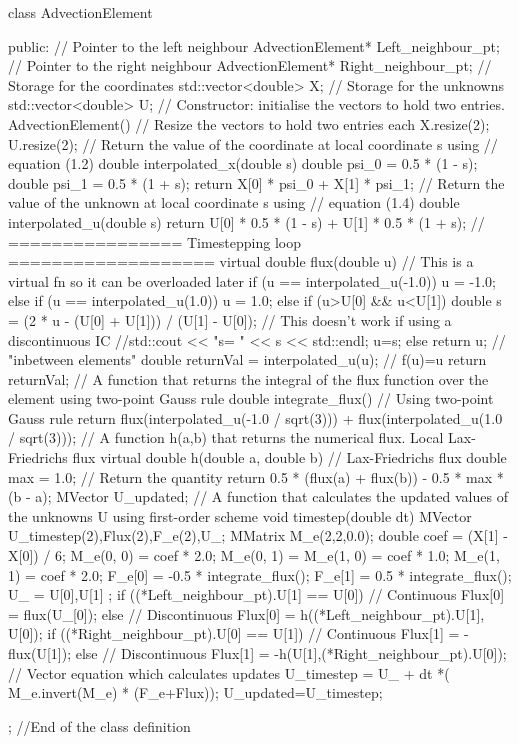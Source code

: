\documentclass[a4paper, 12pt]{article}
\begin{document}
\begin{spverbatim}

class AdvectionElement
{
public:
	// Pointer to the left neighbour
	AdvectionElement* Left_neighbour_pt;
	// Pointer to the right neighbour
	AdvectionElement* Right_neighbour_pt;
	// Storage for the coordinates
	std::vector<double> X;
	// Storage for the unknowns
	std::vector<double> U;
	// Constructor: initialise the vectors to hold two entries.
	AdvectionElement()
	{
		// Resize the vectors to hold two entries each
		X.resize(2);
		U.resize(2);
	}
	// Return the value of the coordinate at local coordinate s using
	// equation (1.2)
	double interpolated_x(double s)
	{
		double psi_0 = 0.5 * (1 - s);
		double psi_1 = 0.5 * (1 + s);
		return X[0] * psi_0 + X[1] * psi_1;
	}
	// Return the value of the unknown at local coordinate s using
	// equation (1.4)
	double interpolated_u(double s)
	{
		return U[0] * 0.5 * (1 - s) + U[1] * 0.5 * (1 + s);
	}
	// ================  Timestepping loop   ===================
	virtual double flux(double u)  // This is a virtual fn so it can be overloaded later
	{
		if (u == interpolated_u(-1.0)) { u = -1.0; }
		else if (u == interpolated_u(1.0)) { u = 1.0; }
		else {
			if (u>U[0] && u<U[1])
			{
				double s = (2 * u - (U[0] + U[1])) / (U[1] - U[0]); // This doesn't work if using a discontinuous IC
				//std::cout << "s= " << s << std::endl;
				u=s;
			}
			else {
				return u; // "inbetween elements"
			}
		}
		double returnVal = interpolated_u(u); // f(u)=u
		return returnVal;
	}
	// A function that returns the integral of the flux function over the element using two-point Gauss rule
	double integrate_flux()
	{
		// Using two-point Gauss rule
		return flux(interpolated_u(-1.0 / sqrt(3))) + flux(interpolated_u(1.0 / sqrt(3)));
	}
	// A function h(a,b) that returns the numerical flux. Local Lax-Friedrichs flux
	virtual double h(double a, double b)
	{
		// Lax-Friedrichs flux
		double max = 1.0;
		// Return the quantity 
		return 0.5 * (flux(a) + flux(b)) - 0.5 * max * (b - a);
	}
	MVector U_updated;
	// A function that calculates the updated values of the unknowns U using first-order scheme
	void timestep(double dt)
	{
		MVector U_timestep(2),Flux(2),F_e(2),U_;
		MMatrix M_e(2,2,0.0);
		double coef = (X[1] - X[0]) / 6;
		M_e(0, 0) = coef * 2.0;
		M_e(0, 1) = M_e(1, 0) = coef * 1.0;
		M_e(1, 1) = coef * 2.0;
		F_e[0] = -0.5 * integrate_flux();
		F_e[1] = 0.5 * integrate_flux();
		U_ = { U[0],U[1] };
		if ((*Left_neighbour_pt).U[1] == U[0])
		{
			// Continuous
			Flux[0] = flux(U_[0]);
		}
		else
		{
			// Discontinuous
			Flux[0] = h((*Left_neighbour_pt).U[1], U[0]);
		}
		if ((*Right_neighbour_pt).U[0] == U[1])
		{
			// Continuous
			Flux[1] = -flux(U[1]);
		}
		else
		{
			// Discontinuous
			Flux[1] = -h(U[1],(*Right_neighbour_pt).U[0]);
		}
		// Vector equation which calculates updates
		U_timestep = U_ + dt *( M_e.invert(M_e) * (F_e+Flux));
		U_updated=U_timestep;
	}
	
}; //End of the class definition
\end{spverbatim}
\end{document}
